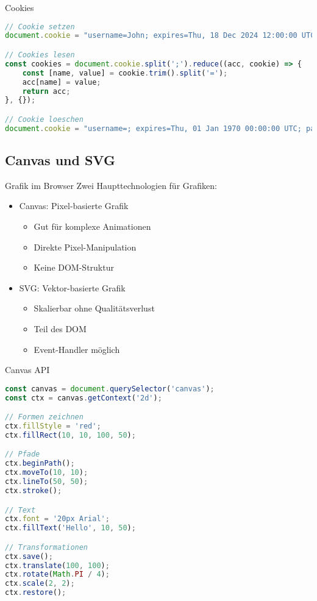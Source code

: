 \begin{KR}{Cookies}
\begin{lstlisting}[language=JavaScript, style=basesmol]
// Cookie setzen
document.cookie = "username=John; expires=Thu, 18 Dec 2024 12:00:00 UTC; path=/";

// Cookies lesen
const cookies = document.cookie.split(';').reduce((acc, cookie) => {
    const [name, value] = cookie.trim().split('=');
    acc[name] = value;
    return acc;
}, {});

// Cookie loeschen
document.cookie = "username=; expires=Thu, 01 Jan 1970 00:00:00 UTC; path=/;";
\end{lstlisting}
\end{KR}

\subsection{Canvas und SVG}

\begin{concept}{Grafik im Browser}
    Zwei Haupttechnologien für Grafiken:
    \begin{itemize}
        \item Canvas: Pixel-basierte Grafik
            \begin{itemize}
                \item Gut für komplexe Animationen
                \item Direkte Pixel-Manipulation
                \item Keine DOM-Struktur
            \end{itemize}
        \item SVG: Vektor-basierte Grafik
            \begin{itemize}
                \item Skalierbar ohne Qualitätsverlust
                \item Teil des DOM
                \item Event-Handler möglich
            \end{itemize}
    \end{itemize}
\end{concept}

\begin{KR}{Canvas API}
\begin{lstlisting}[language=JavaScript, style=basesmol]
const canvas = document.querySelector('canvas');
const ctx = canvas.getContext('2d');

// Formen zeichnen
ctx.fillStyle = 'red';
ctx.fillRect(10, 10, 100, 50);

// Pfade
ctx.beginPath();
ctx.moveTo(10, 10);
ctx.lineTo(50, 50);
ctx.stroke();

// Text
ctx.font = '20px Arial';
ctx.fillText('Hello', 10, 50);

// Transformationen
ctx.save();
ctx.translate(100, 100);
ctx.rotate(Math.PI / 4);
ctx.scale(2, 2);
ctx.restore();
\end{lstlisting}
\end{KR}

